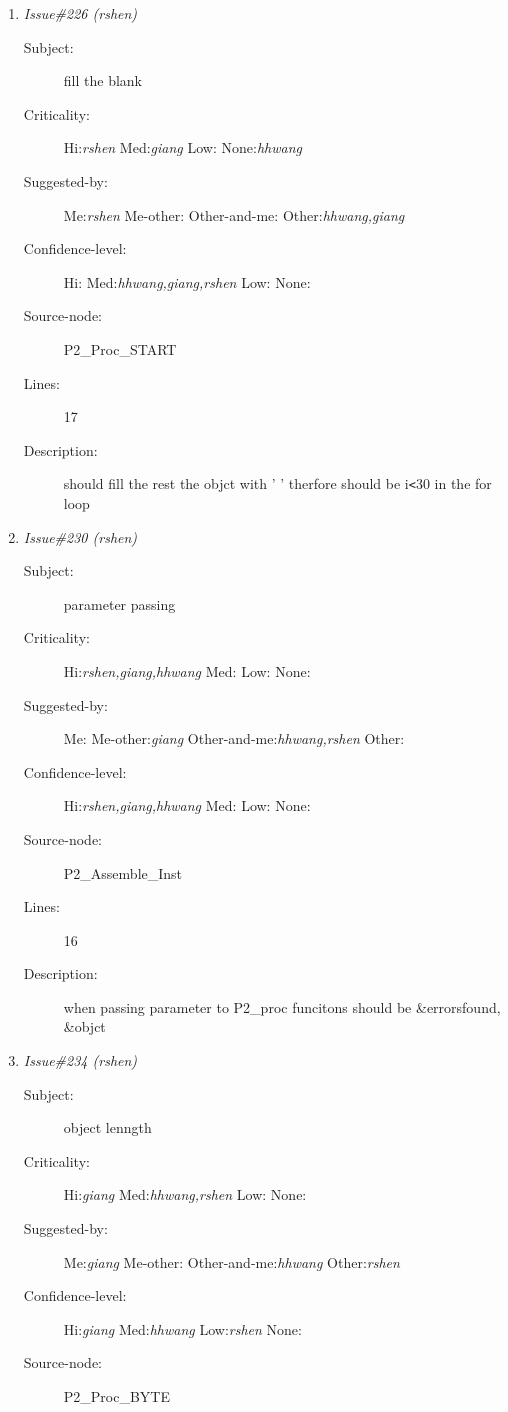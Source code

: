 \begin{enumerate}
\begin{description}
\item [Lines:] 37

\item [Description:] if (FIRSTSTMT...) should be if !(FIRSTSTMT...)
\end{description}
\item {\it Issue\#226 (rshen)}
\begin{description}
\item [Subject:] fill the blank
\item [Criticality:] Hi:{\it rshen} Med:{\it giang} Low:{\it } None:{\it hhwang}
\item [Suggested-by:] Me:{\it rshen} Me-other:{\it } Other-and-me:{\it } Other:{\it hhwang,giang}
\item [Confidence-level:] Hi:{\it } Med:{\it hhwang,giang,rshen} Low:{\it } None:{\it }
\item [Source-node:] P2\_Proc\_START

\item [Lines:] 17

\item [Description:] should fill the rest the objct with ' ' therfore should be i{\tt <}30 in the for
loop
\end{description}
\item {\it Issue\#230 (rshen)}
\begin{description}
\item [Subject:] parameter passing
\item [Criticality:] Hi:{\it rshen,giang,hhwang} Med:{\it } Low:{\it } None:{\it }
\item [Suggested-by:] Me:{\it } Me-other:{\it giang} Other-and-me:{\it hhwang,rshen} Other:{\it }
\item [Confidence-level:] Hi:{\it rshen,giang,hhwang} Med:{\it } Low:{\it } None:{\it }
\item [Source-node:] P2\_Assemble\_Inst

\item [Lines:] 16

\item [Description:] when passing parameter to P2\_proc funcitons should be \&errorsfound, \&objct
\end{description}
\item {\it Issue\#234 (rshen)}
\begin{description}
\item [Subject:] object lenngth
\item [Criticality:] Hi:{\it giang} Med:{\it hhwang,rshen} Low:{\it } None:{\it }
\item [Suggested-by:] Me:{\it giang} Me-other:{\it } Other-and-me:{\it hhwang} Other:{\it rshen}
\item [Confidence-level:] Hi:{\it giang} Med:{\it hhwang} Low:{\it rshen} None:{\it }
\item [Source-node:] P2\_Proc\_BYTE


\end{description}
\end{enumerate}
